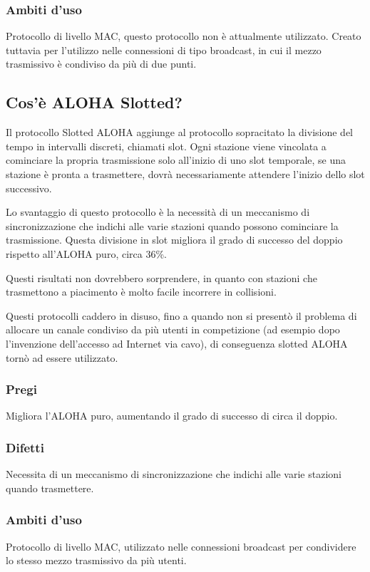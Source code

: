 \subsubsection{Ambiti d'uso}
Protocollo di livello MAC, questo protocollo non è attualmente utilizzato.
Creato tuttavia per l'utilizzo nelle connessioni di tipo broadcast, in cui il mezzo trasmissivo è condiviso da più di due punti.

\subsection{Cos'è ALOHA Slotted?}
Il protocollo Slotted ALOHA aggiunge al protocollo sopracitato la divisione del tempo in intervalli discreti, chiamati slot.
Ogni stazione viene vincolata a cominciare la propria trasmissione solo all'inizio di uno slot temporale,
se una stazione è pronta a trasmettere, dovrà necessariamente attendere l'inizio dello slot successivo.

Lo svantaggio di questo protocollo è la necessità di un meccanismo di sincronizzazione che indichi alle varie stazioni quando possono cominciare la trasmissione.
Questa divisione in slot migliora il grado di successo del doppio rispetto all'ALOHA puro, circa 36\%.

Questi risultati non dovrebbero sorprendere, in quanto con stazioni che trasmettono a piacimento è molto facile incorrere in collisioni.

Questi protocolli caddero in disuso, fino a quando non si presentò il problema di allocare un canale condiviso da più utenti in competizione
(ad esempio dopo l'invenzione dell'accesso ad Internet via cavo), di conseguenza slotted ALOHA tornò ad essere utilizzato.

\subsubsection{Pregi}
Migliora l'ALOHA puro, aumentando il grado di successo di circa il doppio.

\subsubsection{Difetti}
Necessita di un meccanismo di sincronizzazione che indichi alle varie stazioni quando trasmettere.

\subsubsection{Ambiti d'uso}
Protocollo di livello MAC, utilizzato nelle connessioni broadcast per condividere lo stesso mezzo trasmissivo da più utenti.

